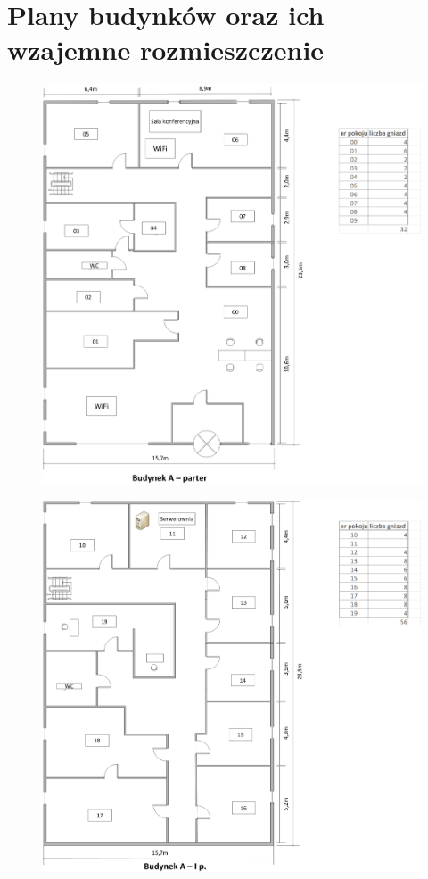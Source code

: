 \documentclass{report}
\begin{document}
\section{Plany budynków oraz ich wzajemne rozmieszczenie}
\begin{figure}[H]
  \centering
      \includegraphics[width=\textwidth]{./obrazki/plany_wew/a0.png}
\end{figure}

\begin{figure}[H]
  \centering
      \includegraphics[width=\textwidth]{./obrazki/plany_wew/a1.png}
\end{figure}
\end{document}
